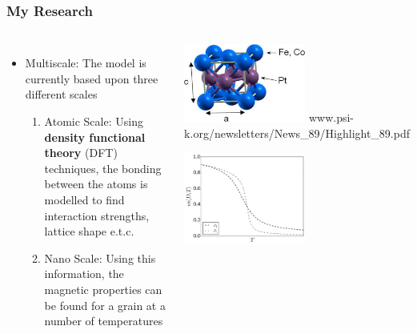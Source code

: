 \documentclass{beamer}
\begin{document}
\begin{frame}
	\frametitle{My Research}
	\begin{columns}
		\column{6cm}
		\begin{itemize}
			\item{Multiscale: The model is currently based upon three different scales}\newline
			\begin{enumerate}
				\item{Atomic Scale: Using \textbf{density functional theory} (DFT) techniques, the bonding between the atoms is modelled to find interaction strengths, lattice shape e.t.c.}\newline
				\item{Nano Scale: Using this information, the magnetic properties can be found for a grain at a number of temperatures}
			\end{enumerate}
		\end{itemize}
		\column{6cm}
		\begin{center}
			\includegraphics[width=4cm]{Images/lattice}\vspace{1mm}
			\tiny{www.psi-k.org/newsletters/News_89/Highlight_89.pdf}
		
			\includegraphics[width=4cm]{Images/Ds_noinset}
		\end{center}
	\end{columns}
\end{frame}
\end{document}
